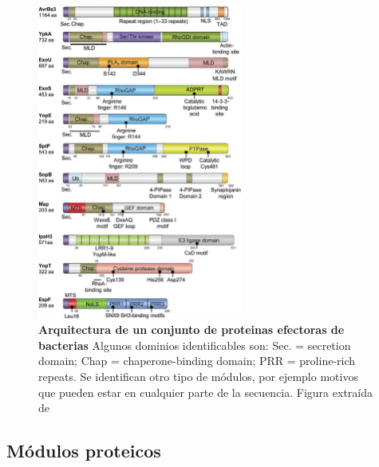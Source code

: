 \begin{figure}[htbp,centered]
\centering
\includegraphics[width=0.6\textwidth]{img/architecture.jpg} 
\caption{\textbf{Arquitectura de un conjunto de proteinas efectoras de bacterias} Algunos dominios identificables son: Sec. = secretion domain; Chap = chaperone-binding domain; PRR = proline-rich repeats. 
Se identifican otro tipo de módulos, por ejemplo motivos que pueden estar en cualquier parte de la secuencia. Figura extraída de \cite{dean2011functional}} 
\label{arquitectura}
\end{figure}



















\subsection{Módulos proteicos} \label{modulosProteicos}
